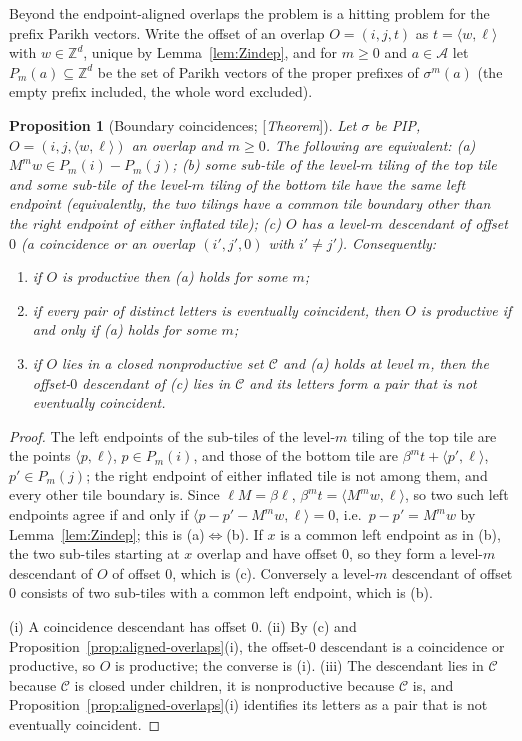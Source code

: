 \documentclass[11pt]{amsart}
\theoremstyle{plain}
\newtheorem{proposition}[theorem]{Proposition}
\theoremstyle{definition}
\theoremstyle{remark}
\newcommand{\Z}{\mathbb{Z}}
\newcommand{\A}{\mathcal{A}}
\newcommand{\cC}{\mathcal{C}}
\newcommand{\Status}[1]{\textup{[\textit{#1}]}}
\begin{document}
Beyond the endpoint-aligned overlaps the problem is a hitting problem for the prefix Parikh vectors. Write the offset of an overlap $O=(i,j,t)$ as $t=\langle w,\ell\rangle$ with $w\in\Z^d$, unique by Lemma~\ref{lem:Zindep}, and for $m\ge0$ and $a\in\A$ let $P_m(a)\subseteq\Z^d$ be the set of Parikh vectors of the proper prefixes of $\sigma^m(a)$ (the empty prefix included, the whole word excluded).

\begin{proposition}[Boundary coincidences; \Status{Theorem}]\label{prop:boundary-coincidence}
Let $\sigma$ be PIP, $O=(i,j,\langle w,\ell\rangle)$ an overlap and $m\ge0$. The following are equivalent: \textup{(a)} $M^mw\in P_m(i)-P_m(j)$; \textup{(b)} some sub-tile of the level-$m$ tiling of the top tile and some sub-tile of the level-$m$ tiling of the bottom tile have the same left endpoint (equivalently, the two tilings have a common tile boundary other than the right endpoint of either inflated tile); \textup{(c)} $O$ has a level-$m$ descendant of offset $0$ (a coincidence or an overlap $(i',j',0)$ with $i'\ne j'$). Consequently:
\begin{enumerate}[label=\textup{(\roman*)},leftmargin=*]
\item if $O$ is productive then \textup{(a)} holds for some $m$;
\item if every pair of distinct letters is eventually coincident, then $O$ is productive if and only if \textup{(a)} holds for some $m$;
\item if $O$ lies in a closed nonproductive set $\cC$ and \textup{(a)} holds at level $m$, then the offset-$0$ descendant of \textup{(c)} lies in $\cC$ and its letters form a pair that is not eventually coincident.
\end{enumerate}
\end{proposition}
\begin{proof}
The left endpoints of the sub-tiles of the level-$m$ tiling of the top tile are the points $\langle p,\ell\rangle$, $p\in P_m(i)$, and those of the bottom tile are $\beta^mt+\langle p',\ell\rangle$, $p'\in P_m(j)$; the right endpoint of either inflated tile is not among them, and every other tile boundary is. Since $\ell M=\beta\ell$, $\beta^mt=\langle M^mw,\ell\rangle$, so two such left endpoints agree if and only if $\langle p-p'-M^mw,\ell\rangle=0$, i.e.\ $p-p'=M^mw$ by Lemma~\ref{lem:Zindep}; this is (a)$\Leftrightarrow$(b). If $x$ is a common left endpoint as in (b), the two sub-tiles starting at $x$ overlap and have offset $0$, so they form a level-$m$ descendant of $O$ of offset $0$, which is (c). Conversely a level-$m$ descendant of offset $0$ consists of two sub-tiles with a common left endpoint, which is (b).

(i) A coincidence descendant has offset $0$. (ii) By (c) and Proposition~\ref{prop:aligned-overlaps}(i), the offset-$0$ descendant is a coincidence or productive, so $O$ is productive; the converse is (i). (iii) The descendant lies in $\cC$ because $\cC$ is closed under children, it is nonproductive because $\cC$ is, and Proposition~\ref{prop:aligned-overlaps}(i) identifies its letters as a pair that is not eventually coincident.
\end{proof}
\end{document}
